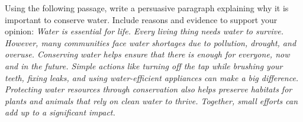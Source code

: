\documentclass[12pt]{article}
\begin{document}
\begin{tcolorbox}[colframe=black!50, colback=white, title=Question 10: Writing Performance Task]
Using the following passage, write a persuasive paragraph explaining why it is important to conserve water. Include reasons and evidence to support your opinion:
\textit{Water is essential for life. Every living thing needs water to survive. However, many communities face water shortages due to pollution, drought, and overuse. Conserving water helps ensure that there is enough for everyone, now and in the future. Simple actions like turning off the tap while brushing your teeth, fixing leaks, and using water-efficient appliances can make a big difference. Protecting water resources through conservation also helps preserve habitats for plants and animals that rely on clean water to thrive. Together, small efforts can add up to a significant impact.}

\vspace{2em}
 \underline{\hspace{15.8cm}}  
    \\[0.8cm] \underline{\hspace{15.8cm}}  
    \\[0.8cm] \underline{\hspace{15.8cm}} 
    \\[0.8cm] \underline{\hspace{15.8cm}}  
    \\[0.8cm] \underline{\hspace{15.8cm}}  
    \\[0.8cm] \underline{\hspace{15.8cm}}
    \\[0.8cm] \underline{\hspace{15.8cm}}  
    \\[0.8cm] \underline{\hspace{15.8cm}}  
    \\[0.8cm] \underline{\hspace{15.8cm}}
    \\[0.8cm] \underline{\hspace{15.8cm}}  
    \\[0.8cm] \underline{\hspace{15.8cm}}  
    \\[0.8cm] \underline{\hspace{15.8cm}}
\end{tcolorbox}
\end{document}
